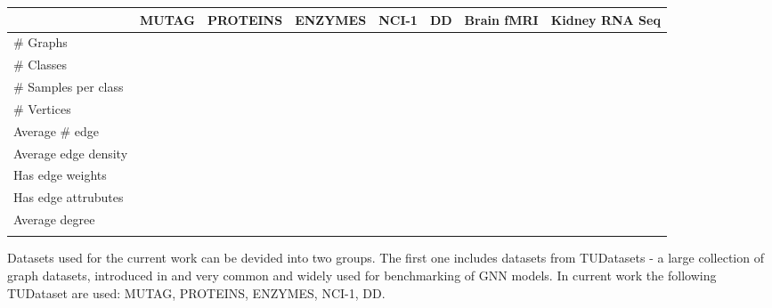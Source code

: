 \begin{center}
    \begin{table}[]
        \scriptsize
        \begin{tabular}{|l|l|l|l|l|l|l|l|}
        \hline
                             & MUTAG & PROTEINS & ENZYMES & NCI-1 & DD & Brain fMRI & Kidney RNA Seq \\ \hline
        \# Graphs            &       &          &         &       &    &            &                \\ \hline
        \# Classes           &       &          &         &       &    &            &                \\ \hline
        \# Samples per class &       &          &         &       &    &            &                \\ \hline
        \# Vertices          &       &          &         &       &    &            &                \\ \hline
        Average \# edge      &       &          &         &       &    &            &                \\ \hline
        Average edge density &       &          &         &       &    &            &                \\ \hline
        Has edge weights     &       &          &         &       &    &            &                \\ \hline
        Has edge attrubutes  &       &          &         &       &    &            &                \\ \hline
        Average degree       &       &          &         &       &    &            &                \\ \hline
                             &       &          &         &       &    &            &                \\ \hline
        \end{tabular}
        \end{table}
\end{center}

Datasets used for the current work can be devided into two groups. The first one includes datasets from TUDatasets \cite{TUDataset} -
a large collection of graph datasets, introduced in \cite{TUDataset} and very common and widely used for benchmarking of GNN models.
In current work the following TUDataset are used: MUTAG, PROTEINS, ENZYMES, NCI-1, DD.


